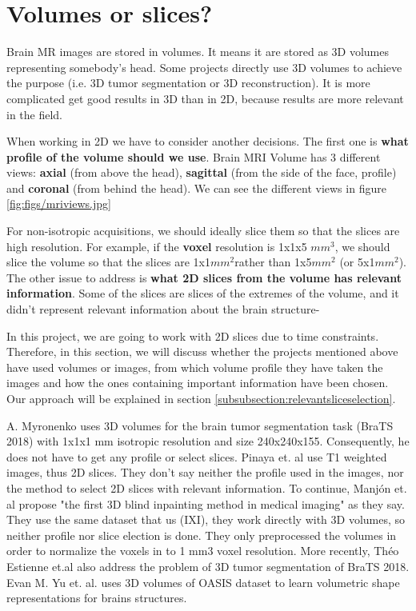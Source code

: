 \section{Volumes or slices?}
\label{section:soa_vols_slices}

Brain MR images are stored in volumes. It means it are stored as 3D volumes representing somebody's head. Some projects directly use 3D volumes to achieve the purpose (i.e. 3D tumor segmentation or 3D reconstruction). It is more complicated get good results in 3D than in 2D, because results are more relevant in the field. 

When working in 2D we have to consider another decisions. The first one is \textbf{what profile of the volume should we use}. Brain MRI Volume has 3 different views: \textbf{axial} (from above the head), \textbf{sagittal} (from the side of the face, profile) and \textbf{coronal} (from behind the head). We can see the different views in figure \ref{fig:figs/mriviews.jpg}


For non-isotropic acquisitions, we should ideally slice them so that the slices are high resolution. For example, if the \textbf{voxel} resolution is 1x1x5 $mm^3$, we should slice the volume so that the slices are 1x1$mm^2$rather than 1x5$mm^2$ (or 5x1$mm^2$). The other issue to address is \textbf{what 2D slices from the volume has relevant information}. Some of the slices are slices of the extremes of the volume, and it didn't represent relevant information about the brain structure-

In this project, we are going to work with 2D slices due to time constraints. Therefore, in this section, we will discuss whether the projects mentioned above have used volumes or images, from which volume profile they have taken the images and how the ones containing important information have been chosen. Our approach will be explained in section \ref{subsubsection:relevantsliceselection}.

A. Myronenko \cite{myronenko20183d} uses 3D volumes for the brain tumor segmentation task (BraTS 2018) with 1x1x1 mm isotropic resolution and size 240x240x155. Consequently, he does not have to get any profile or select slices. Pinaya et. al \cite{pinaya2019} use T1 weighted images, thus 2D slices. They don't say neither the profile used in the images, nor the method to select 2D slices with relevant information. To continue, Manjón et. al \cite{2020inpainting} propose "the first 3D blind inpainting method in medical imaging" as they say. They use the same dataset that us (IXI), they work directly with 3D volumes, so neither profile nor slice election is done. They only preprocessed the volumes in order to normalize the voxels in to 1 mm3 voxel resolution. More recently, Théo Estienne et.al \cite{otherBraTS2020} also address the problem of 3D tumor segmentation of BraTS 2018. Evan M. Yu et. al. \cite{learnvolrepreCODE} uses 3D volumes of OASIS dataset to learn volumetric shape representations for brains structures.

